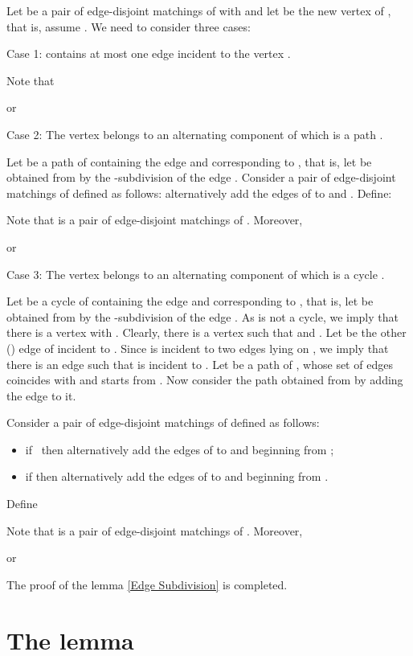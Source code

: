 \documentclass[fleqn,12pt,twoside]{article}
\newenvironment{proof}[1][Proof.]{\begin{trivlist}
\item[\hskip \labelsep {\bfseries #1}]}{\end{trivlist}}
\begin{document}
\begin{proof}
Let  be a pair of edge-disjoint matchings of
 with  and let  be the new vertex of , that is, assume . We need to
consider three cases:

Case 1:  contains at most one edge incident to
the vertex .

Note that

or

Case 2: The vertex  belongs to an alternating component of  which is a path .

Let  be a path of  containing the edge  and corresponding to , that is, let  be obtained from
 by the -subdivision of the edge . Consider a pair of
edge-disjoint matchings  of  defined as
follows: alternatively
add the edges of  to  and . Define:

Note that  is a pair of edge-disjoint matchings of . Moreover,

or

Case 3: The vertex  belongs to an alternating component of  which is a cycle .

Let  be a cycle of  containing the edge  and corresponding to , that is, let  be obtained from
 by the -subdivision of the edge . As  is not a
cycle, we imply that there is a vertex 
with . Clearly, there is a vertex
 such that  and . Let  be the other () edge of  incident to . Since  is
incident
to two edges lying on , we imply that there is an edge   such that  is incident to . Let  be a path of
, whose set of edges coincides with 
and starts from . Now consider the path  obtained from
 by adding the edge  to it.

Consider a pair of edge-disjoint matchings 
of  defined as follows:

\begin{itemize}
\item if  \ then alternatively add the edges of  to 
and  beginning from ;

\item if  then alternatively add the edges of 
to  and  beginning from .
\end{itemize}

Define

Note that  is a pair of edge-disjoint matchings of . Moreover,

or

The proof of the lemma \ref{Edge Subdivision} is completed.
\end{proof}

\section{The lemma}
\end{document}
